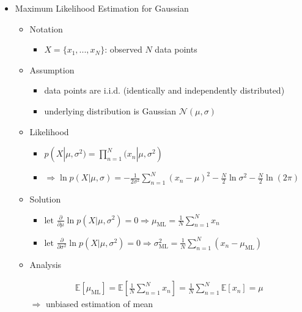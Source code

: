 \begin{itemize}
\item Maximum Likelihood Estimation for Gaussian
	\begin{itemize}
	\item Notation
		\begin{itemize}
		\item $X=\{x_1,...,x_N\}$: observed $N$ data points
		\end{itemize}
	\item Assumption
		\begin{itemize}
		\item data points are i.i.d. (identically and independently distributed)
		\item underlying distribution is Gaussian $\mathcal N(\mu, \sigma)$
		\end{itemize}
	\item Likelihood
		\begin{itemize}
		\item $\displaystyle p(X|\mu,\sigma^2) = \prod_{n=1}^N \mathcal(x_n|\mu,\sigma^2)$
		\item $\displaystyle \Rightarrow \ln p(X|\mu,\sigma) = -\frac 1{2\sigma^2} \sum_{n=1}^N(x_n-\mu)^2 -\frac N2 \ln \sigma^2 -\frac N2 \ln (2\pi)$
		\end{itemize}
	\item Solution
		\begin{itemize}
		\item $\displaystyle \text{let } \frac {\partial}{\partial \mu} \ln p(X|\mu,\sigma^2) = 0 \Rightarrow \mu_{\text{ML}}=\frac 1N \sum_{n=1}^Nx_n $
		\item $\displaystyle \text{let } \frac {\partial}{\partial \sigma^2} \ln p(X|\mu,\sigma^2)=0 \Rightarrow \sigma_\text{ML}^2 = \frac 1N \sum_{n=1}^N (x_n- \mu_\text{ML})$
		\end{itemize}
	\item Analysis
		\begin{itemize}
		\Item \begin{align*} \displaystyle \mathbb E[\mu_\text{ML}] = \mathbb E[\frac 1N \sum_{n=1}^Nx_n] = \frac 1N \sum_{n=1}^N \mathbb E[x_n] = \mu \tag{as \(x_1,...,x_N\) i.i.d, drawn from \(\mathcal N(\mu,\sigma^2)\), thus \(\sim \mathcal N(\mu,\sigma^2)\)} \end{align*}
		$\Rightarrow$ unbiased estimation of mean
		

\end{itemize}
\end{itemize}
\end{itemize}
